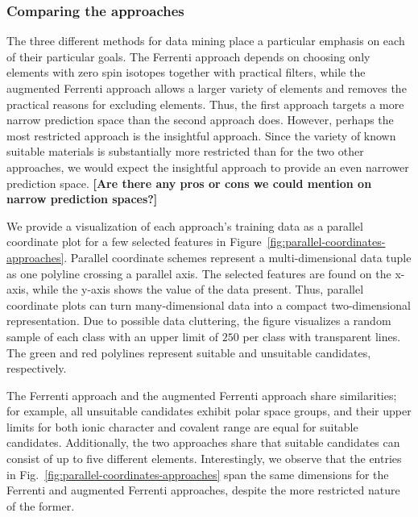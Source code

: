 \documentclass[superscriptaddress,unsortedaddress,
 amsmath,amssymb,
 aps,
]{revtex4-2}
\newcommand{\marianne}[1]{\textcolor{blue}{#1}}
\begin{document}
\subsubsection*{Comparing the approaches}

The three different methods for data mining place a particular emphasis on each of their particular goals. The Ferrenti approach depends on choosing only elements with zero spin isotopes together with practical filters, while the augmented Ferrenti approach allows a larger variety of elements and removes the practical reasons for excluding elements. Thus, the first approach targets a more narrow prediction space than the second approach does. However, perhaps the most restricted approach is the insightful approach. Since the variety of known suitable materials is substantially more restricted than for the two other approaches, we would expect the insightful approach to provide an even narrower prediction space. 
\textbf{[Are there any pros or cons we could mention on narrow prediction spaces?]}


We provide a visualization of each approach's training data as a parallel coordinate plot for a few selected features in Figure~\ref{fig:parallel-coordinates-approaches}. Parallel coordinate schemes \cite{Inselberga1990, Inselberg1985} represent a multi-dimensional data tuple as one polyline crossing a parallel axis. The selected features are found on the x-axis, while the y-axis shows the value of the data present. Thus, parallel coordinate plots can turn many-dimensional data into a compact two-dimensional representation. Due to possible data cluttering, the figure visualizes a random sample of each class with an upper limit of $250$ per class with transparent lines. The green and red polylines represent suitable and unsuitable candidates, respectively. 

The Ferrenti approach and the augmented Ferrenti approach share similarities; 
for example, all unsuitable candidates exhibit polar space groups, and their upper limits for both ionic character and covalent range are equal for suitable candidates.  
Additionally, the two approaches share that suitable candidates can consist of up to five different elements. 
Interestingly, we observe that
the entries in Fig.~\ref{fig:parallel-coordinates-approaches} span the same dimensions for the Ferrenti and augmented Ferrenti approaches, despite the more restricted nature of the former. 
\end{document}
